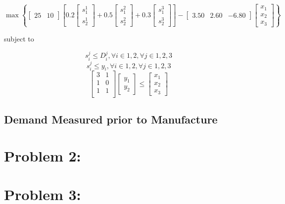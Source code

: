 \documentclass[a4paper]{article}
\begin{document}
\begin{equation}
\max \left \{ [\begin{matrix}25 & 10\end{matrix}]
\left[ 0.2 \left [\begin{matrix}s_1^1 \\ s_2^1 \end{matrix} \right ] + 0.5 \left [\begin{matrix}s_1^2 \\ s_2^2 \end{matrix} \right ] + 0.3 \left [\begin{matrix}s_1^3 \\ s_2^3 \end{matrix} \right ] \right]
-[\begin{matrix}3.50 & 2.60 & -6.80\end{matrix}] \left [\begin{matrix}x_1 \\ x_2 \\ x_3 \end{matrix} \right ]
\right \}
\end{equation}

subject to

\begin{equation}
s_i^j \leq D_i^j , \forall i \in {1,2} , \forall j \in {1,2,3}
\end{equation}
\begin{equation}
s_i^j \leq y_i , \forall i \in {1,2} , \forall j \in {1,2,3}
\end{equation}
\begin{equation}
\left[
\begin{matrix}
3 & 1 \\
1 & 0 \\
1 & 1 \\
\end{matrix}
\right]
\left[\begin{matrix}y_1 \\ y_2\end{matrix}\right]
\leq
\left[\begin{matrix}x_1 \\ x_2 \\ x_3 \end{matrix}\right]
\end{equation}

\subsection{Demand Measured prior to Manufacture}

\section{Problem 2: }

\section{Problem 3: }
\end{document}
